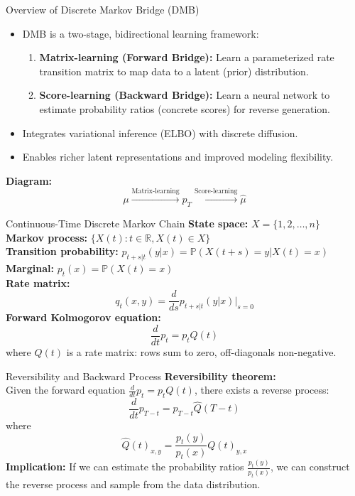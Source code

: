 \documentclass{beamer}
\begin{document}
\begin{frame}{Overview of Discrete Markov Bridge (DMB)}
  \begin{itemize}
    \item DMB is a two-stage, bidirectional learning framework:
      \begin{enumerate}
        \item \textbf{Matrix-learning (Forward Bridge):} Learn a parameterized rate transition matrix to map data to a latent (prior) distribution.
        \item \textbf{Score-learning (Backward Bridge):} Learn a neural network to estimate probability ratios (concrete scores) for reverse generation.
      \end{enumerate}
    \item Integrates variational inference (ELBO) with discrete diffusion.
    \item Enables richer latent representations and improved modeling flexibility.
  \end{itemize}
  \vspace{1em}
  \textbf{Diagram:}
  \[
    \mu \xrightarrow{\text{Matrix-learning}} p_T \xrightarrow{\text{Score-learning}} \hat{\mu}
  \]
\end{frame}

\begin{frame}{Continuous-Time Discrete Markov Chain}
  \textbf{State space:} $X = \{1, 2, \dots, n\}$\\
  \textbf{Markov process:} $\{X(t): t \in \mathbb{R}, X(t) \in X\}$\\
  \textbf{Transition probability:} $p_{t+s|t}(y|x) = \mathbb{P}(X(t+s)=y | X(t)=x)$\\
  \textbf{Marginal:} $p_t(x) = \mathbb{P}(X(t) = x)$\\
  \textbf{Rate matrix:}
  \[
    q_t(x, y) = \frac{d}{ds} p_{t+s|t}(y|x)\bigg|_{s=0}
  \]
  \textbf{Forward Kolmogorov equation:}
  \[
    \frac{d}{dt} p_t = p_t Q(t)
  \]
  where $Q(t)$ is a rate matrix: rows sum to zero, off-diagonals non-negative.
\end{frame}

\begin{frame}{Reversibility and Backward Process}
  \textbf{Reversibility theorem:}\\
  Given the forward equation $\frac{d}{dt} p_t = p_t Q(t)$, there exists a reverse process:
  \[
    \frac{d}{dt} p_{T-t} = p_{T-t} \hat{Q}(T-t)
  \]
  where
  \[
    \hat{Q}(t)_{x,y} = \frac{p_t(y)}{p_t(x)} Q(t)_{y,x}
  \]
  \textbf{Implication:} If we can estimate the probability ratios $\frac{p_t(y)}{p_t(x)}$, we can construct the reverse process and sample from the data distribution.
\end{frame}
\end{document}
